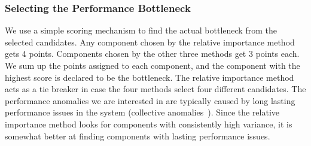 \subsubsection{Selecting the Performance Bottleneck}


We use a simple scoring mechanism to
find the actual bottleneck from the selected candidates. 
Any component chosen by the relative importance
method gets 4 points. Components chosen by the other three methods get 3 points each. 
We sum up the points assigned to each component, and the component with the highest
score is declared to be the bottleneck. The relative importance method acts as a tie breaker
in case the four methods select four different candidates. The performance anomalies we
are interested in are typically caused by long lasting performance issues in the system 
(collective anomalies~\cite{Chandola:2009:ADS:1541880.1541882}). 
Since the relative importance method looks for components with
consistently high variance, it is somewhat better at finding components
with lasting performance issues.
